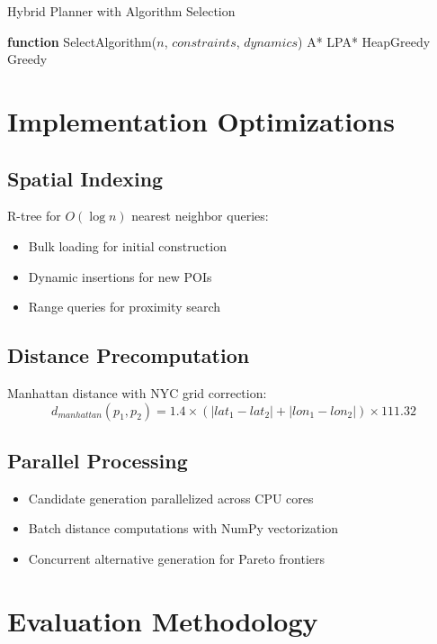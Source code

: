 \begin{algorithm}
\caption{Hybrid Planner with Algorithm Selection}
\begin{algorithmic}
\STATE \textbf{function} SelectAlgorithm($n$, $constraints$, $dynamics$)
    \RETURN A*
    \RETURN LPA*
    \RETURN HeapGreedy
\ELSE
    \RETURN Greedy
\ENDIF
\end{algorithmic}
\end{algorithm}

\section{Implementation Optimizations}

\subsection{Spatial Indexing}
R-tree for $O(\log n)$ nearest neighbor queries:
\begin{itemize}
    \item Bulk loading for initial construction
    \item Dynamic insertions for new POIs
    \item Range queries for proximity search
\end{itemize}

\subsection{Distance Precomputation}
Manhattan distance with NYC grid correction:
$$d_{manhattan}(p_1, p_2) = 1.4 \times (|lat_1 - lat_2| + |lon_1 - lon_2|) \times 111.32$$

\subsection{Parallel Processing}
\begin{itemize}
    \item Candidate generation parallelized across CPU cores
    \item Batch distance computations with NumPy vectorization
    \item Concurrent alternative generation for Pareto frontiers
\end{itemize}

\section{Evaluation Methodology}


